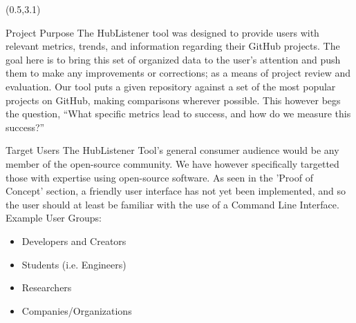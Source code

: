 \documentclass[22pt]{beamer}
\begin{document}
\begin{frame}[fragile]
\begin{textblock}{7.25}(0.5,3.1)
\begin{block}{Project Purpose}
The HubListener tool was designed to provide users with relevant metrics, trends, and information regarding their GitHub projects. The goal here is to bring this set of organized data to the user’s attention and push them to make any improvements or corrections; as a means of project review and evaluation. Our tool puts a given repository against a set of the most popular projects on GitHub, making comparisons wherever possible. This however begs the question, “What specific metrics lead to success, and how do we measure this success?”
\end{block}

\begin{block}{Target Users}
The HubListener Tool's general consumer audience would be any member of the open-source community. We have however specifically targetted those with expertise using open-source software. As seen in the 'Proof of Concept' section, a friendly user interface has not yet been implemented, and so the user should at least be familiar with the use of a Command Line Interface.
\newline
\newline
Example User Groups:
\begin{itemize}
\item Developers and Creators 
\item Students (i.e. Engineers)
\item Researchers
\item Companies/Organizations
\end{itemize}
\end{block}


\end{textblock}
\end{frame}
\end{document}
